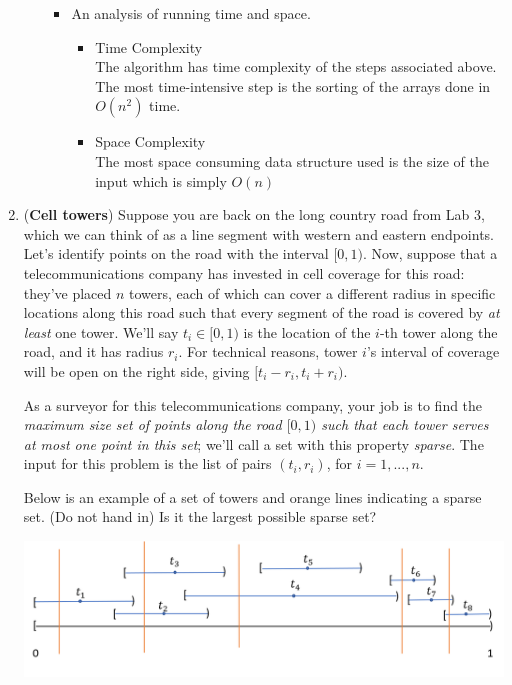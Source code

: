 \documentclass[letterpaper,11pt]{article}
\begin{document}
\begin{enumerate}
\begin{itemize}
\begin{itemize}
          \item An analysis of running time and space.
              \begin{itemize}
                  \item Time Complexity\\
                      The algorithm has time complexity of the steps associated
                      above. The most time-intensive step is the sorting of the 
                      arrays done in $O\left( n^2 \right) $ time. 
                  \item Space Complexity\\
                      The most space consuming data structure used is the size
                      of the input which is simply $O\left( n \right) $
              \end{itemize}
      \end{itemize}
  \end{itemize}
  
  
  
  
  
  \item(\textbf{Cell towers}) Suppose you are back on the long country road from Lab 3, which we can think of as a line segment with western and eastern endpoints. Let's identify points on the road with the interval $[0,1)$. Now, suppose that a  telecommunications company has invested in cell coverage for this road: they've placed $n$ towers, each of which can cover a different radius  in specific locations along this road such that every segment of the road is covered by \emph{at least} one tower. We'll say $t_i\in [0,1)$ is the location of the $i$-th tower along the road, and it has radius $r_i$. For technical reasons, tower $i$'s interval of coverage will be open on the right side, giving $[t_i - r_i, t_i + r_i)$. 
  
  As a surveyor for this telecommunications company, your job is to find the \textit{maximum size set of points along the road $[0,1)$ such that each
tower serves at most one point in this set}; we'll call a  set with this property \textit{sparse}.  The input for this problem is the list of pairs $(t_i,r_i)$, for $i=1,...,n$.



Below is an example of a set of towers and orange lines indicating a sparse set. (Do not hand in) Is it the largest possible sparse set?

\begin{center}
    \includegraphics[scale=0.7]{cell_tower_set}
\end{center}




\end{enumerate}
\end{document}
